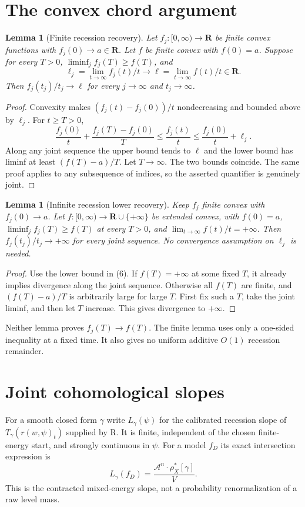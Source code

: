 \documentclass[11pt]{article}
\newtheorem{lemma}[theorem]{Lemma}
\begin{document}
\section{The convex chord argument}
\begin{lemma}[Finite recession recovery]\label{convex}
Let $f_j:[0,\infty)\to\mathbf R$ be finite convex functions with
$f_j(0)\to a\in\mathbf R$. Let $f$ be finite convex with $f(0)=a$.
Suppose for every $T>0$, $\liminf_j f_j(T)\ge f(T)$,
and
\[
 \ell_j=\lim_{t\to\infty}f_j(t)/t\to\ell
           =\lim_{t\to\infty}f(t)/t\in\mathbf R.
\]
Then $f_j(t_j)/t_j\to\ell$ for every $j\to\infty$ and
$t_j\to\infty$.
\end{lemma}
\begin{proof}
Convexity makes $(f_j(t)-f_j(0))/t$ nondecreasing and bounded above
by $\ell_j$. For $t\ge T>0$,
\[
 \frac{f_j(0)}t+\frac{f_j(T)-f_j(0)}T
 \le\frac{f_j(t)}t\le\frac{f_j(0)}t+\ell_j.          \tag{6}
\]
Along any joint sequence the upper bound tends to $\ell$ and the
lower bound has liminf at least $(f(T)-a)/T$. Let $T\to\infty$.
The two bounds coincide. The same proof applies to any subsequence
of indices, so the asserted quantifier is genuinely joint.
\end{proof}

\begin{lemma}[Infinite recession lower recovery]\label{infinite}
Keep $f_j$ finite convex with $f_j(0)\to a$.
Let $f:[0,\infty)\to\mathbf R\cup\{+\infty\}$ be extended convex,
with $f(0)=a$, $\liminf_j f_j(T)\ge f(T)$ at every $T>0$, and
$\lim_{t\to\infty}f(t)/t=+\infty$.
Then $f_j(t_j)/t_j\to+\infty$ for every joint sequence.
No convergence assumption on $\ell_j$ is needed.
\end{lemma}
\begin{proof}
Use the lower bound in (6). If $f(T)=+\infty$ at some fixed $T$,
it already implies divergence along the joint sequence. Otherwise
all $f(T)$ are finite, and $(f(T)-a)/T$ is arbitrarily large for
large $T$. First fix such a $T$, take the joint liminf, and then
let $T$ increase. This gives divergence to $+\infty$.
\end{proof}

Neither lemma proves $f_j(T)\to f(T)$. The finite lemma uses only
a one-sided inequality at a fixed time. It also gives no uniform
additive $O(1)$ recession remainder.

\section{Joint cohomological slopes}
For a smooth closed form $\gamma$ write $L_\gamma(\psi)$ for the
calibrated recession slope of $T_\gamma(r(w,\psi)_t)$ supplied by R.
It is finite, independent of the chosen finite-energy start, and
strongly continuous in $\psi$. For a model $f_D$ its exact
intersection expression is
\[
 L_\gamma(f_D)=\frac{\mathcal A^n\cdot\rho_X^*[\gamma]}V.
 \tag{7}
\]
This is the contracted mixed-energy slope, not a probability
renormalization of a raw level mass.
\end{document}
